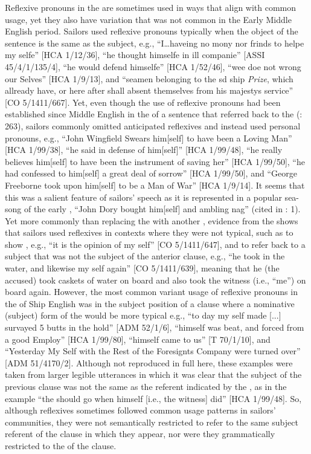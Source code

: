 Reflexive pronouns in the  are sometimes used in ways that align with common usage, yet they also have variation that was not common in the Early Middle English period. Sailors used reflexive pronouns typically when the object of the sentence is the same as the subject, e.g., “I…haveing no mony nor frinds to helpe my selfe” [HCA 1/12/36], “he thought himselfe in ill companie” [ASSI 45/4/1/135/4], “he would defend himselfe” [HCA 1/52/46], “wee doe not wrong our Selves” [HCA 1/9/13], and “seamen belonging to the sd ship \textit{ Prize}, which allready have, or here after shall absent themselves from his majestys service” [CO 5/1411/667]. Yet, even though the use of reflexive pronouns had been established since Middle English in the  of a sentence that referred back to the  (\citealt{MillwardHayes2012}: 263), sailors commonly omitted anticipated reflexives and instead used  personal pronouns, e.g., “John Wingfield Swears him[self] to have been a Loving Man” [HCA 1/99/38], “he said in defense of him[self]” [HCA 1/99/48], “he really believes him[self] to have been the instrument of saving her” [HCA 1/99/50], “he had confessed to him[self] a great deal of sorrow” [HCA 1/99/50], and “George Freeborne took upon him[self] to be a Man of War” [HCA 1/9/14]. It seems that this was a salient feature of sailors’ speech as it is represented in a popular sea-song of the early , “John Dory bought him[self] and ambling nag” (cited in \citealt{Palmer1986}: 1). Yet more commonly than replacing the  with another , evidence from the  shows that sailors used reflexives in contexts where they were not typical, such as to show , e.g., “it is the opinion of my self” [CO 5/1411/647], and to refer back to a subject that was not the subject of the anterior clause, e.g., “he took in the water, and likewise my self again” [CO 5/1411/639], meaning that he (the accused) took caskets of water on board and also took the witness (i.e., “me”) on board again. However, the most common variant usage of reflexive pronouns in the  of Ship English was in the subject position of a clause where a nominative (subject) form of the  would be more typical e.g., “to day my self made [...] survayed 5 butts in the hold” [ADM 52/1/6], “himself was beat, and forced from a good Employ” [HCA 1/99/80], “himself came to us” [T 70/1/10], and “Yesterday My Self with the Rest of the Foresignts Company were turned over” [ADM 51/4170/2]. Although not reproduced in full here, these examples were taken from larger legible utterances in which it was clear that the subject of the previous clause was not the same as the referent indicated by the , as in the example “the  should go when himself [i.e., the witness] did” [HCA 1/99/48]. So, although reflexives sometimes followed common usage patterns in sailors’ communities, they were not semantically restricted to refer to the same subject referent of the clause in which they appear, nor were they grammatically restricted to the  of the clause. 

